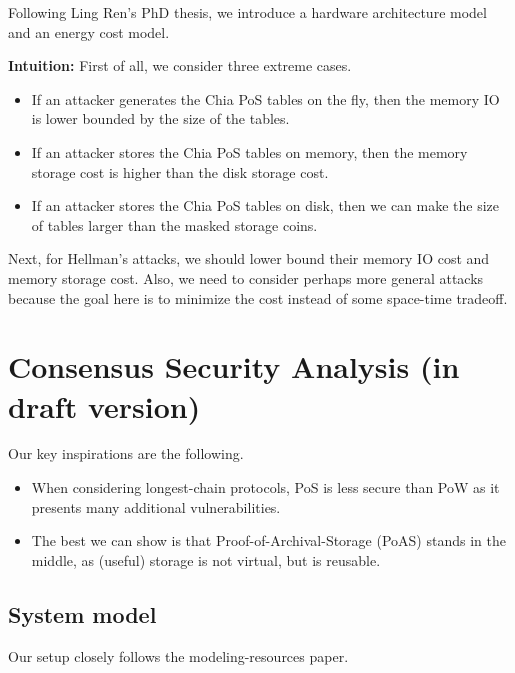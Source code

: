 \documentclass[12pt,draftcls,onecolumn]{IEEEtran}
\begin{document}
Following Ling Ren's PhD thesis, we introduce a hardware architecture model and an energy cost model.

{\bf Intuition:} First of all, we consider three extreme cases.
\begin{itemize}
    \item If an attacker generates the Chia PoS tables on the fly, then the memory IO is lower bounded by the size of the tables.
    \item If an attacker stores the Chia PoS tables on memory, then the memory storage cost is higher than the disk storage cost.
    \item If an attacker stores the Chia PoS tables on disk, then we can make the size of tables larger than the masked storage coins.
\end{itemize}

Next, for Hellman's attacks, we should lower bound their memory IO cost and memory storage cost.
Also, we need to consider perhaps more general attacks because the goal here is to minimize the cost instead of some space-time tradeoff.

\section{Consensus Security Analysis (in draft version)}

Our key inspirations are the following.

\begin{itemize}
    \item When considering longest-chain protocols, PoS is less secure than PoW as it presents many additional vulnerabilities. 
    \item The best we can show is that Proof-of-Archival-Storage (PoAS) stands in the middle, as (useful) storage is not virtual, but is reusable.
\end{itemize}

\subsection{System model}







Our setup closely follows the modeling-resources paper.
\end{document}
